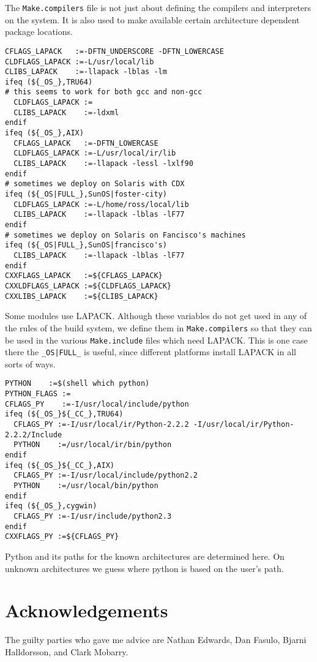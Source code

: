 \documentclass[letterpaper]{article}
\begin{document}
The \verb+Make.compilers+ file is not just about defining the compilers
and interpreters on the system.  It is also used to make available certain
architecture dependent package locations.
\begin{verbatim}
CFLAGS_LAPACK   :=-DFTN_UNDERSCORE -DFTN_LOWERCASE
CLDFLAGS_LAPACK :=-L/usr/local/lib
CLIBS_LAPACK    :=-llapack -lblas -lm
ifeq (${_OS_},TRU64)
# this seems to work for both gcc and non-gcc
  CLDFLAGS_LAPACK :=
  CLIBS_LAPACK    :=-ldxml
endif
ifeq (${_OS_},AIX)
  CFLAGS_LAPACK   :=-DFTN_LOWERCASE
  CLDFLAGS_LAPACK :=-L/usr/local/ir/lib
  CLIBS_LAPACK    :=-llapack -lessl -lxlf90
endif
# sometimes we deploy on Solaris with CDX
ifeq (${_OS|FULL_},SunOS|foster-city)
  CLDFLAGS_LAPACK :=-L/home/ross/local/lib
  CLIBS_LAPACK    :=-llapack -lblas -lF77
endif
# sometimes we deploy on Solaris on Fancisco's machines
ifeq (${_OS|FULL_},SunOS|francisco's)
  CLIBS_LAPACK    :=-llapack -lblas -lF77
endif
CXXFLAGS_LAPACK   :=${CFLAGS_LAPACK}
CXXLDFLAGS_LAPACK :=${CLDFLAGS_LAPACK}
CXXLIBS_LAPACK    :=${CLIBS_LAPACK}
\end{verbatim}
Some modules use LAPACK.  Although these variables do not get used
in any of the rules of the build system, we define them in 
\verb+Make.compilers+ so that they can be used in the various
\verb+Make.include+ files which need LAPACK.  This is one case
there the \verb+_OS|FULL_+ is useful, since different platforms
install LAPACK in all sorts of ways.

\begin{verbatim}
PYTHON    :=$(shell which python)
PYTHON_FLAGS :=
CFLAGS_PY    :=-I/usr/local/include/python
ifeq (${_OS_}${_CC_},TRU64)
  CFLAGS_PY :=-I/usr/local/ir/Python-2.2.2 -I/usr/local/ir/Python-2.2.2/Include
  PYTHON    :=/usr/local/ir/bin/python
endif
ifeq (${_OS_}${_CC_},AIX)
  CFLAGS_PY :=-I/usr/local/include/python2.2
  PYTHON    :=/usr/local/bin/python
endif
ifeq (${_OS_},cygwin)
  CFLAGS_PY :=-I/usr/include/python2.3
endif
CXXFLAGS_PY :=${CFLAGS_PY}
\end{verbatim}
Python and its paths for the known architectures are determined here.  On
unknown architectures we guess where python is based on the user's path.

\section{Acknowledgements}

The guilty parties who gave me advice are Nathan Edwards, Dan Fasulo,
Bjarni Halldorsson, and Clark Mobarry.
\end{document}
